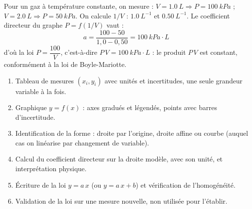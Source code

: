 \documentclass[11pt]{article}
\begin{document}
\begin{exemplebox}
Pour un gaz à température constante, on mesure : $V = \SI{1,0}{L} \Rightarrow P = \SI{100}{kPa}$ ; $V = \SI{2,0}{L} \Rightarrow P = \SI{50}{kPa}$. On calcule $1/V$ : $\SI{1,0}{L^{-1}}$ et $\SI{0,50}{L^{-1}}$. Le coefficient directeur du graphe $P = f(1/V)$ vaut :
\[ a = \frac{100 - 50}{1{,}0 - 0{,}50} = \SI{100}{kPa \cdot L} \]
d'où la loi $P = \dfrac{100}{V}$, c'est-à-dire $P\,V = \SI{100}{kPa \cdot L}$ : le produit $P\,V$ est constant, conformément à la loi de Boyle-Mariotte.
\end{exemplebox}

\begin{methode}
\begin{enumerate}
\item Tableau de mesures $(x_i, y_i)$ avec unités et incertitudes, une seule grandeur variable à la fois.
\item Graphique $y = f(x)$ : axes gradués et légendés, points avec barres d'incertitude.
\item Identification de la forme : droite par l'origine, droite affine ou courbe (auquel cas on linéarise par changement de variable).
\item Calcul du coefficient directeur sur la droite modèle, avec son unité, et interprétation physique.
\item Écriture de la loi $y = a\,x$ (ou $y = a\,x + b$) et vérification de l'homogénéité.
\item Validation de la loi sur une mesure nouvelle, non utilisée pour l'établir.
\end{enumerate}
\end{methode}
\end{document}
